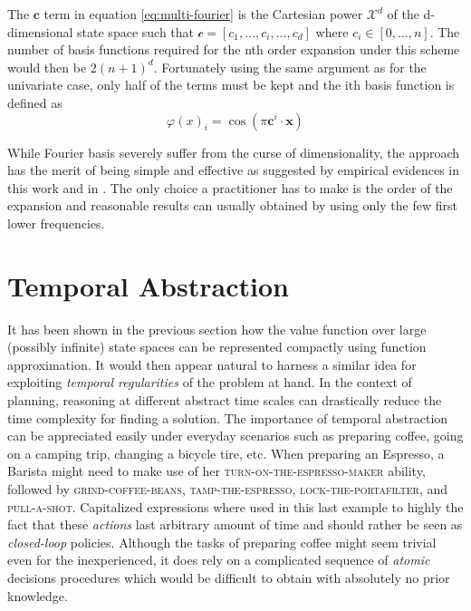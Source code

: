 \documentclass[12pt, oneside, extrafontsizes]{memoir}  %
\theoremstyle{plain}
\theoremstyle{definition}
\begin{document}
The $\mathbf{c}$ term in equation \ref{eq:multi-fourier} is the Cartesian power 
$\mathcal{X}^d$ of the d-dimensional state space such that $\mathcal{c} = [c_1,
\dots, c_i, \dots, c_d]$ where $c_i \in [0, \dots, n]$. The number of basis functions
required for the nth order expansion under this scheme would then be $2(n+1)^d$.
Fortunately using the same argument as for the univariate case, only half of the terms
must be kept and the ith basis function is defined as
\begin{equation}
\varphi(x)_i = \cos \left(  \pi \mathbf{c}^i \cdot \mathbf{x} \right)
\end{equation}

While Fourier basis severely suffer from the curse of dimensionality, the approach has
the merit of being simple and effective as suggested by empirical evidences in this
work and in \cite{Konidaris2011b} . The only choice a practitioner has to make is the
order of the expansion and reasonable results can usually obtained by using only the
few first lower frequencies.

\chapter{Temporal Abstraction}

It has been shown in the previous section how the value function over large 
(possibly infinite)
state spaces can be represented compactly using function approximation. It would
then appear natural to harness a similar idea for exploiting \textit{temporal
regularities} of the problem at hand. In the context of planning, reasoning at different
abstract time scales can drastically reduce the time complexity for finding a solution. 
The importance of temporal abstraction can be appreciated easily under everyday
scenarios such as preparing coffee, going on a camping trip, changing a bicycle tire,
etc. When preparing an Espresso, a Barista might need to make use of her
\textsc{turn-on-the-espresso-maker} ability, followed by \textsc{grind-coffee-beans},
\textsc{tamp-the-espresso}, \textsc{lock-the-portafilter}, and \textsc{pull-a-shot}.
Capitalized expressions where used in this last example to highly the fact that these
\textit{actions} last arbitrary amount of time and should rather be seen as
\textit{closed-loop} policies. Although the tasks of preparing coffee might seem trivial
even for the inexperienced, it does rely on a complicated sequence of \textit{atomic}
decisions procedures which would be difficult to obtain with absolutely no prior
knowledge. 
\end{document}
